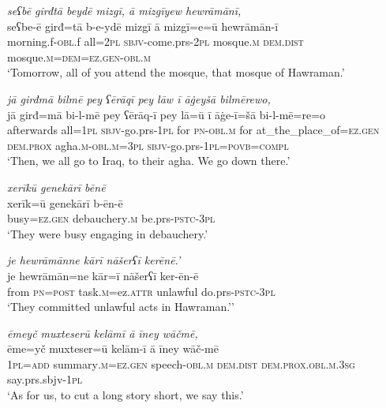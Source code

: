 \ea \label{BP.54}
\textit{seʕbē girđtā beydē mizgī, ā mizgīyew hewrāmānī,} \\ 
\gll seʕbe-ē girđ=tā b-e-ydē mizgī ā mizgī=e=ū hewrāmān-ī \\ 
 morning.f\textsc{-obl}.f all=\textsc{2pl} \textsc{sbjv-}come.prs-\textsc{2pl} mosque\textsc{.m} \textsc{dem.dist} mosque\textsc{.m}\textsc{=dem}\textsc{=ez.gen}\textsc{-obl}\textsc{.m} \\ 
\glt `Tomorrow, all of you attend the mosque, that mosque of Hawraman.'
\z 
 
\ea \label{BP.56}
\textit{jā girđmā bilmē pey ʕērāqī pey lāw ī āġeyšā bilmērewo,} \\ 
\gll jā girđ=mā bi-l-mē pey ʕērāq-ī pey lā=ū ī āġe-ī=šā bi-l-mē=re=o \\ 
 afterwards all\textsc{=\textsc{1pl}} \textsc{sbjv-}go.prs\textsc{-\textsc{1pl}} for \textsc{pn}\textsc{-obl}\textsc{.m} for at\_the\_place\_of\textsc{=ez.gen} \textsc{dem.prox} agha\textsc{.m}\textsc{-obl}\textsc{.m}\textsc{=3pl} \textsc{sbjv-}go.prs\textsc{-\textsc{1pl}}\textsc{=\textsc{povb}}\textsc{=compl} \\ 
\glt `Then, we all go to Iraq, to their agha. We go down there.'
\z 
 
\ea \label{BP.61}
\textit{xerīkū genekārī bēnē} \\ 
\gll xerīk=ū genekārī b-ēn-ē \\ 
 busy\textsc{=ez.gen} debauchery\textsc{.m} be.prs\textsc{-pstc}\textsc{-3pl} \\ 
\glt `They were busy engaging in debauchery.'
\z 
 
\ea \label{BP.62}
\textit{je hewrāmānne kārī nāšerʕī kerēnē.’} \\ 
\gll je hewrāmān=ne kār=ī nāšerʕī ker-ēn-ē \\ 
 from \textsc{pn}\textsc{=\textsc{post}} task\textsc{.m}=ez.\textsc{attr} unlawful do.prs\textsc{-pstc}\textsc{-3pl} \\ 
\glt `They committed unlawful acts in Hawraman.’'
\z 
 
\ea \label{BP.63}
\textit{ēmeyč muxteserū kelāmī ā īney wāčmē,} \\ 
\gll ēme=yč muxteser=ū kelām-ī ā īney wāč-mē \\ 
 \textsc{1pl}\textsc{=add} summary\textsc{.m}\textsc{=ez.gen} speech\textsc{-obl}\textsc{.m} \textsc{dem.dist} \textsc{dem.prox}\textsc{.obl}\textsc{.m}\textsc{.3sg} say.prs.sbjv\textsc{-\textsc{1pl}} \\ 
\glt `As for us, to cut a long story short, we say this.'
\z 
 
